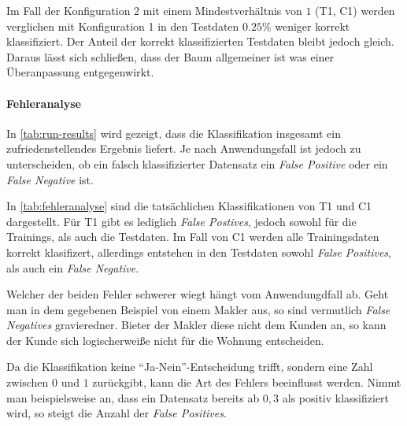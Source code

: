 Im Fall der Konfiguration 2 mit einem Mindestverhältnis von $1$ (T1, C1) werden verglichen mit Konfiguration 1 in den Testdaten $0.25\%$ weniger korrekt klassifiziert.
Der Anteil der korrekt klassifizierten Testdaten bleibt jedoch gleich.
Daraus lässt sich schließen,
dass der Baum allgemeiner ist was einer Überanpassung entgegenwirkt.

\paragraph{Fehleranalyse}
In \autoref{tab:run-results} wird gezeigt, dass die Klassifikation insgesamt ein zufriedenstellendes Ergebnis liefert.
Je nach Anwendungsfall ist jedoch zu unterscheiden,
ob ein falsch klassifizierter Datensatz ein \emph{False Positive} oder ein \emph{False Negative} ist.

In \autoref{tab:fehleranalyse} sind die tatsächlichen Klassifikationen von T1 und C1 dargestellt.
Für T1 gibt es lediglich \emph{False Postives}, jedoch sowohl für die Trainings,
als auch die Testdaten.
Im Fall von C1 werden alle Trainingsdaten korrekt klasifizert,
allerdings entstehen in den Testdaten sowohl \emph{False Positives}, als auch ein \emph{False Negative}.

Welcher der beiden Fehler schwerer wiegt hängt vom Anwendungdfall ab.
Geht man in dem gegebenen Beispiel von einem Makler aus,
so sind vermutlich \emph{False Negatives} gravieredner.
Bieter der Makler diese nicht dem Kunden an,
so kann der Kunde sich logischerweiße nicht für die Wohnung entscheiden.

Da die Klassifikation keine \enquote{Ja-Nein}-Entscheidung trifft,
sondern eine Zahl zwischen $0$ und $1$ zurückgibt,
kann die Art des Fehlers beeinflusst werden.
Nimmt man beispielsweise an,
dass ein Datensatz bereits ab $0,3$ als positiv klassifiziert wird,
so steigt die Anzahl der \emph{False Positives}.

